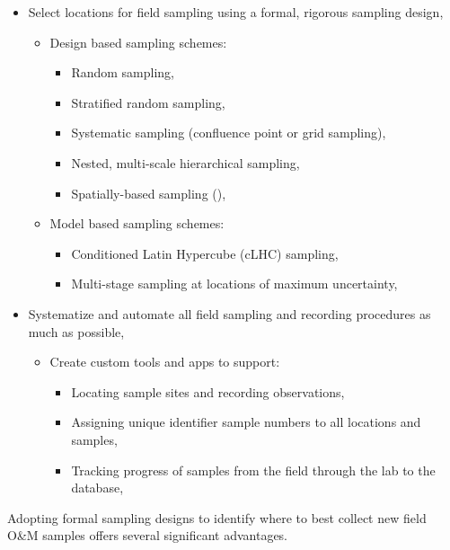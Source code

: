 \documentclass[graybox,natbib,nospthms,UStrade]{svmono}
\begin{document}
\begin{itemize}
\item
  Select locations for field sampling using a formal, rigorous
  sampling design,

  \begin{itemize}
  \item
    Design based sampling schemes:

    \begin{itemize}
    \item
      Random sampling,
    \item
      Stratified random sampling,
    \item
      Systematic sampling (confluence point or grid sampling),
    \item
      Nested, multi-scale hierarchical sampling,
    \item
      Spatially-based sampling (\citet{BrownPES2015}),
    \end{itemize}
  \item
    Model based sampling schemes:

    \begin{itemize}
    \item
      Conditioned Latin Hypercube (cLHC) sampling,
    \item
      Multi-stage sampling at locations of maximum uncertainty,
    \end{itemize}
  \end{itemize}
\item
  Systematize and automate all field sampling and recording procedures
  as much as possible,

  \begin{itemize}
  \item
    Create custom tools and apps to support:

    \begin{itemize}
    \item
      Locating sample sites and recording observations,
    \item
      Assigning unique identifier sample numbers to all locations
      and samples,
    \item
      Tracking progress of samples from the field through the lab
      to the database,
    \end{itemize}
  \end{itemize}
\end{itemize}

Adopting formal sampling designs to identify where to best collect new
field O\&M samples offers several significant advantages.
\end{document}

